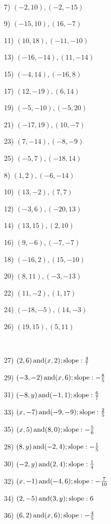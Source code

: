 \vspace{1in}
~

\pagebreak

{}

\begin{multicols}{2}
  7) $(- 2, 10), (- 2, - 15)$
  
  9) $(- 15, 10), (16, - 7)$
  
  11) $(10, 18), (- 11, - 10)$
  
  13) $(- 16, - 14), (11, - 14)$
  
  15) $(- 4, 14), (- 16, 8)$
  
  17) $(12, - 19), (6, 14)$
  
  19) $(- 5, - 10), (- 5, 20)$
  
  21) $(- 17, 19), (10, - 7)$
  
  23) $(7, - 14), (- 8, - 9)$
  
  25) $(- 5, 7), (- 18, 14)$
  
  8) $(1, 2), (- 6, - 14)$
  
  10) $(13, - 2), (7, 7)$
  
  12) $(- 3, 6), (- 20, 13)$
  
  14) $(13, 15), (2, 10)$
  
  16) $(9, - 6), (- 7, - 7)$
  
  18) $(- 16, 2), (15, - 10)$
  
  20) $(8, 11), (- 3, - 13)$
  
  22) $(11, - 2), (1, 17)$
  
  24) $(- 18, - 5), (14, - 3)$
  
  26) $(19, 15), (5, 11)$
\end{multicols}

\

{}

\begin{multicols}{2}
  27) $(2, 6) \operatorname{and} (x, 2) ; \operatorname{slope} : \frac{4}{7}$
  
  29) $(- 3, - 2) \operatorname{and} (x, 6) ; \operatorname{slope} : - \frac{8}{5}$
  
  31) $(- 8, y) \operatorname{and} (- 1, 1) ; \operatorname{slope} : \frac{6}{7}$
  
  33) $(x, - 7) \operatorname{and} (- 9, - 9) ; \operatorname{slope} : \frac{2}{5}$
  
  35) $(x, 5) \operatorname{and} (8, 0) ; \operatorname{slope} : - \frac{5}{6}$
  
  28) $(8, y) \operatorname{and} (- 2, 4) ; \operatorname{slope} : - \frac{1}{5}$
  
  30) $(- 2, y) \operatorname{and} (2, 4) ; \operatorname{slope} : \frac{1}{4}$
  
  32) $(x, - 1) \operatorname{and} (- 4, 6) ; \operatorname{slope} : - \frac{7}{10}$
  
  34) $(2, - 5) \operatorname{and} (3, y) ; \operatorname{slope} : 6$
  
  36) $(6, 2) \operatorname{and} (x, 6) ; \operatorname{slope} : - \frac{4}{5}$
\end{multicols}

